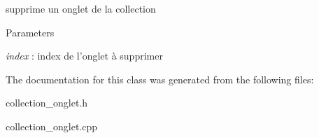 supprime un onglet de la collection 


\begin{DoxyParams}{Parameters}
\item[{\em index}]: index de l'onglet à supprimer \end{DoxyParams}


The documentation for this class was generated from the following files:\begin{DoxyCompactItemize}
\item 
collection\_\-onglet.h\item 
collection\_\-onglet.cpp\end{DoxyCompactItemize}
